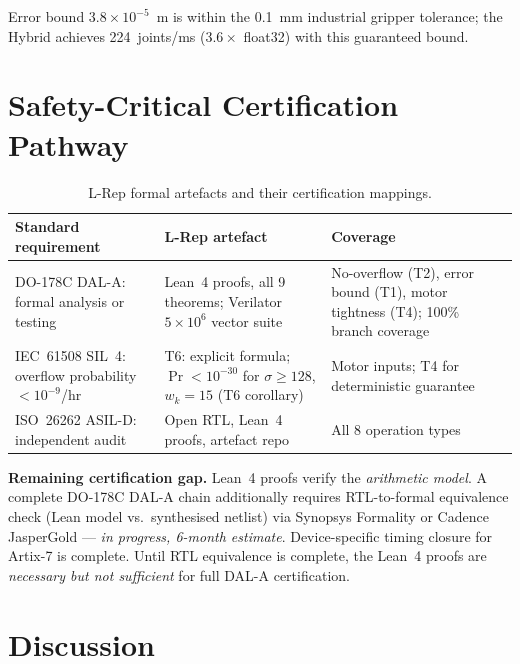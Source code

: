 \documentclass[11pt,a4paper]{article}
\theoremstyle{definition}
\theoremstyle{plain}
\theoremstyle{remark}
\begin{document}
Error bound $3.8\times10^{-5}$~m is within the 0.1~mm industrial gripper tolerance;
the Hybrid achieves 224~joints/ms ($3.6\times$ float32) with this guaranteed bound.

\section{Safety-Critical Certification Pathway}
\label{sec:safety}

\begin{table}[h]
\centering
\caption{L-Rep formal artefacts and their certification mappings.}
\label{tab:cert}
\begin{tabular}{p{3.8cm}p{4cm}p{4cm}}
\toprule
Standard requirement & L-Rep artefact & Coverage \\
\midrule
DO-178C DAL-A: formal analysis or testing &
Lean~4 proofs, all 9 theorems; Verilator $5\times10^6$ vector suite &
No-overflow (T2), error bound (T1), motor tightness (T4);
100\% branch coverage \\
IEC~61508 SIL~4: overflow probability $<10^{-9}$/hr &
T6: explicit formula; $\Pr<10^{-30}$ for $\sigma\ge128$, $w_k=15$ (T6 corollary) &
Motor inputs; T4 for deterministic guarantee \\
ISO~26262 ASIL-D: independent audit &
Open RTL, Lean~4 proofs, artefact repo &
All 8 operation types \\
\bottomrule
\end{tabular}
\end{table}

\begin{warningbox}
\textbf{Remaining certification gap.}
Lean~4 proofs verify the \emph{arithmetic model}.
A complete DO-178C DAL-A chain additionally requires RTL-to-formal
equivalence check (Lean model vs.\ synthesised netlist) via Synopsys
Formality or Cadence JasperGold --- \emph{in progress, 6-month estimate}.
Device-specific timing closure for Artix-7 is complete.
Until RTL equivalence is complete, the Lean~4 proofs are
\emph{necessary but not sufficient} for full DAL-A certification.
\end{warningbox}

\section{Discussion}
\label{sec:discuss}
\end{document}
